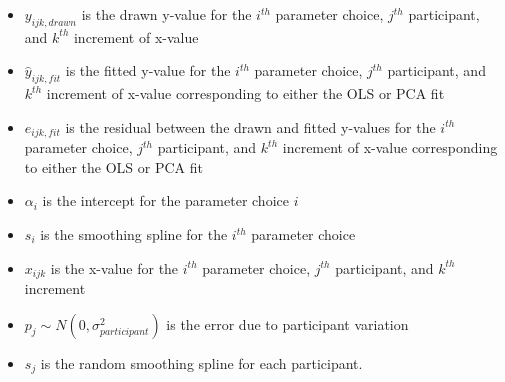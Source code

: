 \begin{appendix}
\begin{itemize}
\tightlist
\item
  \(y_{ijk,drawn}\) is the drawn y-value for the \(i^{th}\) parameter
  choice, \(j^{th}\) participant, and \(k^{th}\) increment of x-value
\item
  \(\hat y_{ijk,fit}\) is the fitted y-value for the \(i^{th}\)
  parameter choice, \(j^{th}\) participant, and \(k^{th}\) increment of
  x-value corresponding to either the OLS or PCA fit
\item
  \(e_{ijk,fit}\) is the residual between the drawn and fitted y-values
  for the \(i^{th}\) parameter choice, \(j^{th}\) participant, and
  \(k^{th}\) increment of x-value corresponding to either the OLS or PCA
  fit
\item
  \(\alpha_i\) is the intercept for the parameter choice \(i\)
\item
  \(s_{i}\) is the smoothing spline for the \(i^{th}\) parameter choice
\item
  \(x_{ijk}\) is the x-value for the \(i^{th}\) parameter choice,
  \(j^{th}\) participant, and \(k^{th}\) increment
\item
  \(p_{j} \sim N(0, \sigma^2_{participant})\) is the error due to
  participant variation
\item
  \(s_{j}\) is the random smoothing spline for each participant.
\end{itemize}
\end{appendix}

